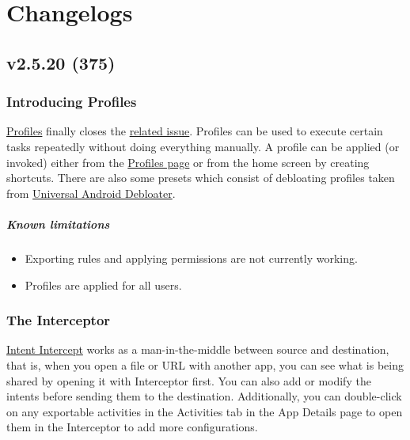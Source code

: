 \chapter{Changelogs}\label{ch:changelogs}

\section{v2.5.20 (375)}\label{sec:v2.5.20-(375)}

\subsection{Introducing Profiles}\label{subsec:introducing-profiles}
\hyperref[sec:profile-page]{Profiles} finally closes the
\href{https://github.com/MuntashirAkon/AppManager/issues/72}{related issue}. Profiles can be used to execute certain
tasks repeatedly without doing everything manually. A profile can be applied (or invoked) either from the
\hyperref[sec:profiles-page]{Profiles page} or from the home screen by creating shortcuts. There are also some presets
which consist of debloating profiles taken from
\href{https://gitlab.com/W1nst0n/universal-android-debloater}{Universal Android Debloater}.

\paragraph{Known limitations}
\begin{itemize}
    \item Exporting rules and applying permissions are not currently working.
    \item Profiles are applied for all users.
\end{itemize}

\subsection{The Interceptor}\label{subsec:the-interceptor}
\href{https://github.com/MuntashirAkon/intent-intercept}{Intent Intercept} works as a man-in-the-middle between source
and destination, that is, when you open a file or URL with another app, you can see what is being shared by opening it
with Interceptor first. You can also add or modify the intents before sending them to the destination. Additionally,
you can double-click on any exportable activities in the Activities tab in the App Details page to open them in the
Interceptor to add more configurations.

